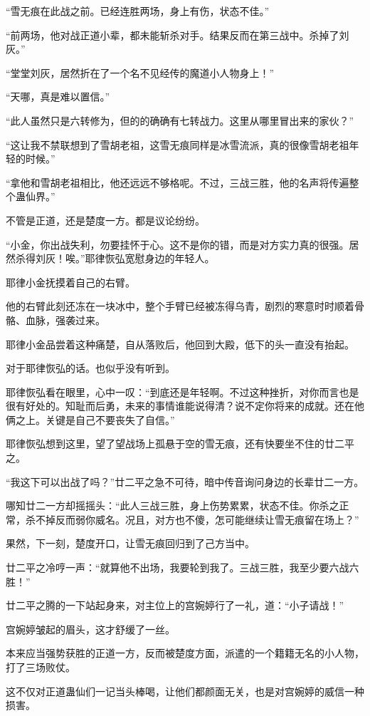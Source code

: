 \begin{this_body}
“雪无痕在此战之前。已经连胜两场，身上有伤，状态不佳。”

“前两场，他对战正道小辈，都未能斩杀对手。结果反而在第三战中。杀掉了刘灰。”

“堂堂刘灰，居然折在了一个名不见经传的魔道小人物身上！”

“天哪，真是难以置信。”

“此人虽然只是六转修为，但的的确确有七转战力。这里从哪里冒出来的家伙？”

“这让我不禁联想到了雪胡老祖，这雪无痕同样是冰雪流派，真的很像雪胡老祖年轻的时候。”

“拿他和雪胡老祖相比，他还远远不够格呢。不过，三战三胜，他的名声将传遍整个蛊仙界。”

不管是正道，还是楚度一方。都是议论纷纷。

“小金，你出战失利，勿要挂怀于心。这不是你的错，而是对方实力真的很强。居然杀得刘灰！唉。”耶律恢弘宽慰身边的年轻人。

耶律小金抚摸着自己的右臂。

他的右臂此刻还冻在一块冰中，整个手臂已经被冻得乌青，剧烈的寒意时时顺着骨骼、血脉，强袭过来。

耶律小金品尝着这种痛楚，自从落败后，他回到大殿，低下的头一直没有抬起。

对于耶律恢弘的话。也似乎没有听到。

耶律恢弘看在眼里，心中一叹：“到底还是年轻啊。不过这种挫折，对你而言也是很有好处的。知耻而后勇，未来的事情谁能说得清？说不定你将来的成就。还在他俩之上。关键是自己不要丧失了自信。”

耶律恢弘想到这里，望了望战场上孤悬于空的雪无痕，还有快要坐不住的廿二平之。

“我这下可以出战了吗？”廿二平之急不可待，暗中传音询问身边的长辈廿二一方。

哪知廿二一方却摇摇头：“此人三战三胜，身上伤势累累，状态不佳。你杀之正常，杀不掉反而弱你威名。况且，对方也不傻，怎可能继续让雪无痕留在场上？”

果然，下一刻，楚度开口，让雪无痕回归到了己方当中。

廿二平之冷哼一声：“就算他不出场，我要轮到我了。三战三胜，我至少要六战六胜！”

廿二平之腾的一下站起身来，对主位上的宫婉婷行了一礼，道：“小子请战！”

宫婉婷皱起的眉头，这才舒缓了一丝。

本来应当强势获胜的正道一方，反而被楚度方面，派遣的一个籍籍无名的小人物，打了三场败仗。

这不仅对正道蛊仙们一记当头棒喝，让他们都颜面无关，也是对宫婉婷的威信一种损害。


\end{this_body}
